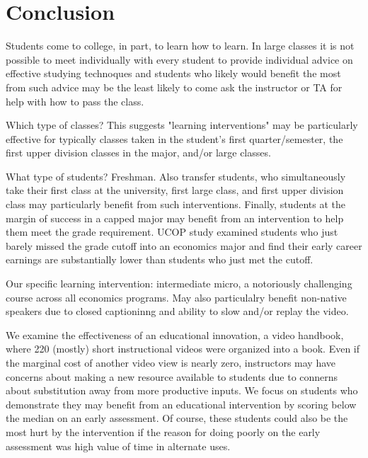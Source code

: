\documentclass[12pt]{article}
\begin{document}

\section{Conclusion} \label{conclusion}
Students come to college, in part, to learn how to learn.  In large classes it is not possible to meet individually with every student to provide individual advice on effective studying technoques and students who likely would benefit the most from such advice may be the least likely to come ask the instructor or TA for help with how to pass the class.  

Which type of classes?  This suggests "learning interventions" may be particularly effective for typically classes taken in the student's first quarter/semester, the first upper division classes in the major, and/or large classes. 

What type of students? Freshman.  Also transfer students, who simultaneously take their first class at the university, first large class, and first upper division class may particularly benefit from such interventions.  Finally, students at the margin of success in a capped major may benefit from an intervention to help them meet the grade requirement.  UCOP study examined students who just barely missed the grade cutoff into an economics major and find their early career earnings are substantially lower than students who just met the cutoff.

Our specific learning intervention:  intermediate micro, a notoriously challenging course across all economics programs.  May also particulalry benefit non-native speakers due to closed captioninng and ability to slow and/or replay the video.  

We examine the effectiveness of an educational innovation, a video handbook, where 220 (mostly) short instructional videos were organized into a book.  Even if the marginal cost of another video view is nearly zero, instructors may have concerns about making a new resource available to students due to connerns about substitution away from more productive inputs. We focus on students who demonstrate they may benefit from an educational intervention by scoring below the median on an early assessment.  Of course, these students could also be the most hurt by the intervention if the reason for doing poorly on the early assessment was high value of time in alternate uses.
\end{document}
